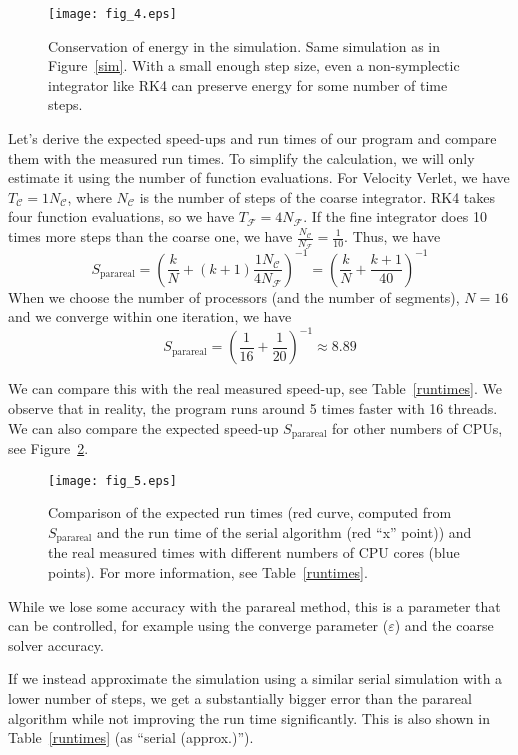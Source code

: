 \documentclass[conference]{IEEEtran}
\begin{document}
\begin{figure}[htbp]
\centerline{\texttt{[image: fig\_4.eps]}}
\caption{Conservation of energy in the simulation. Same simulation as in Figure~\ref{sim}. With a small enough step size, even a non-symplectic integrator like RK4 can preserve energy for some number of time steps.}
\label{energy}
\end{figure}

Let's derive the expected speed-ups and run times of our program and compare them with the measured run times. To simplify the calculation, we will only estimate it using the number of function evaluations. For Velocity Verlet, we have $T_\mathcal{C} = 1N_\mathcal{C}$, where $N_\mathcal{C}$ is the number of steps of the coarse integrator. RK4 takes four function evaluations, so we have $T_\mathcal{F} = 4N_\mathcal{F}$. If the fine integrator does 10 times more steps than the coarse one, we have $\frac{N_\mathcal{C}}{N_\mathcal{F}} = \frac{1}{10}$. Thus, we have
$$
S_\text{parareal} = \left(\frac{k}{N} + (k+1)\frac{1N_\mathcal{C}}{4N_\mathcal{F}}\right)^{-1} = \left(\frac{k}{N} + \frac{k+1}{40}\right)^{-1}
$$
When we choose the number of processors (and the number of segments), $N = 16$ and we converge within one iteration, we have
$$
S_\text{parareal} = \left(\frac{1}{16} + \frac{1}{20}\right)^{-1} \approx 8.89
$$

We can compare this with the real measured speed-up, see Table~\ref{runtimes}. We observe that in reality, the program runs around 5 times faster with 16 threads. We can also compare the expected speed-up $S_\text{parareal}$ for other numbers of CPUs, see Figure~\ref{speeds}.

\begin{figure}[htbp]
\centerline{\texttt{[image: fig\_5.eps]}}
\caption{Comparison of the expected run times (red curve, computed from $S_\text{parareal}$ and the run time of the serial algorithm (red ``x'' point)) and the real measured times with different numbers of CPU cores (blue points). For more information, see Table~\ref{runtimes}.}
\label{speeds}
\end{figure}

While we lose some accuracy with the parareal method, this is a parameter that can be controlled, for example using the converge parameter ($\varepsilon$) and the coarse solver accuracy. 

If we instead approximate the simulation using a similar serial simulation with a lower number of steps, we get a substantially bigger error than the parareal algorithm while not improving the run time significantly. This is also shown in Table~\ref{runtimes} (as ``serial (approx.)'').
\end{document}
